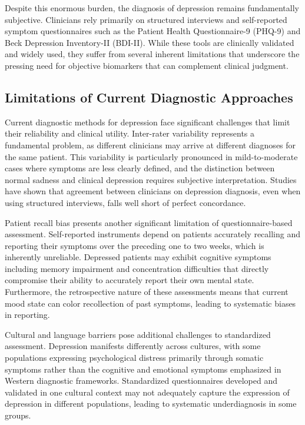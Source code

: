 Despite this enormous burden, the diagnosis of depression remains fundamentally subjective. Clinicians rely primarily on structured interviews and self-reported symptom questionnaires such as the Patient Health Questionnaire-9 (PHQ-9) and Beck Depression Inventory-II (BDI-II). While these tools are clinically validated and widely used, they suffer from several inherent limitations that underscore the pressing need for objective biomarkers that can complement clinical judgment.

\subsection{Limitations of Current Diagnostic Approaches}

Current diagnostic methods for depression face significant challenges that limit their reliability and clinical utility. Inter-rater variability represents a fundamental problem, as different clinicians may arrive at different diagnoses for the same patient. This variability is particularly pronounced in mild-to-moderate cases where symptoms are less clearly defined, and the distinction between normal sadness and clinical depression requires subjective interpretation. Studies have shown that agreement between clinicians on depression diagnosis, even when using structured interviews, falls well short of perfect concordance.

Patient recall bias presents another significant limitation of questionnaire-based assessment. Self-reported instruments depend on patients accurately recalling and reporting their symptoms over the preceding one to two weeks, which is inherently unreliable. Depressed patients may exhibit cognitive symptoms including memory impairment and concentration difficulties that directly compromise their ability to accurately report their own mental state. Furthermore, the retrospective nature of these assessments means that current mood state can color recollection of past symptoms, leading to systematic biases in reporting.

Cultural and language barriers pose additional challenges to standardized assessment. Depression manifests differently across cultures, with some populations expressing psychological distress primarily through somatic symptoms rather than the cognitive and emotional symptoms emphasized in Western diagnostic frameworks. Standardized questionnaires developed and validated in one cultural context may not adequately capture the expression of depression in different populations, leading to systematic underdiagnosis in some groups.

